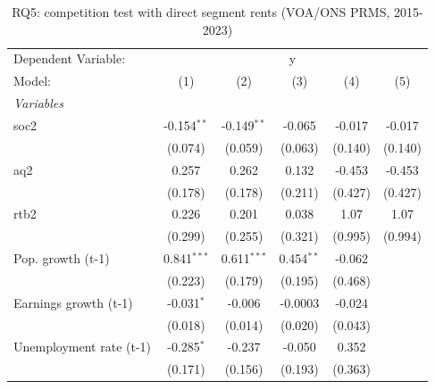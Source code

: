 
\begin{table}[htbp]
   \caption{RQ5: competition test with direct segment rents (VOA/ONS PRMS, 2015-2023)}
   \centering
   \begin{tabular}{lccccc}
      \tabularnewline \midrule \midrule
      Dependent Variable: & \multicolumn{5}{c}{y}\\
      Model:                                                 & (1)           & (2)           & (3)          & (4)     & (5)\\  
      \midrule
      \emph{Variables}\\
      soc2                                                   & -0.154$^{**}$ & -0.149$^{**}$ & -0.065       & -0.017  & -0.017\\   
                                                             & (0.074)       & (0.059)       & (0.063)      & (0.140) & (0.140)\\   
      aq2                                                    & 0.257         & 0.262         & 0.132        & -0.453  & -0.453\\   
                                                             & (0.178)       & (0.178)       & (0.211)      & (0.427) & (0.427)\\   
      rtb2                                                   & 0.226         & 0.201         & 0.038        & 1.07    & 1.07\\   
                                                             & (0.299)       & (0.255)       & (0.321)      & (0.995) & (0.994)\\   
      Pop. growth (t-1)                                      & 0.841$^{***}$ & 0.611$^{***}$ & 0.454$^{**}$ & -0.062  &   \\   
                                                             & (0.223)       & (0.179)       & (0.195)      & (0.468) &   \\   
      Earnings growth (t-1)                                  & -0.031$^{*}$  & -0.006        & -0.0003      & -0.024  &   \\   
                                                             & (0.018)       & (0.014)       & (0.020)      & (0.043) &   \\   
      Unemployment rate (t-1)                                & -0.285$^{*}$  & -0.237        & -0.050       & 0.352   &   \\   
                                                             & (0.171)       & (0.156)       & (0.193)      & (0.363) &   \\   

\end{tabular}
\end{table}
